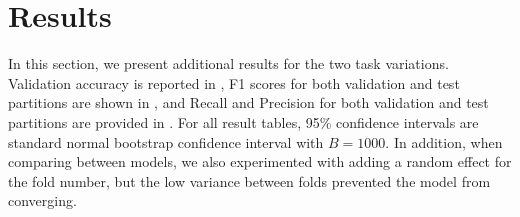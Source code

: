 \section{Results}
\label{app:results}
In this section, we present additional results for the two task variations. Validation accuracy is reported in , F1 scores for both validation and test partitions are shown in , and Recall and Precision for both validation and test partitions are provided in . For all result tables, 95\% confidence intervals are standard normal bootstrap confidence interval \cite{davison1997bootstrap} with $B=1000$. In addition, when comparing between models, we also experimented with adding a random effect for the fold number, but the low variance between folds prevented the model from converging.

